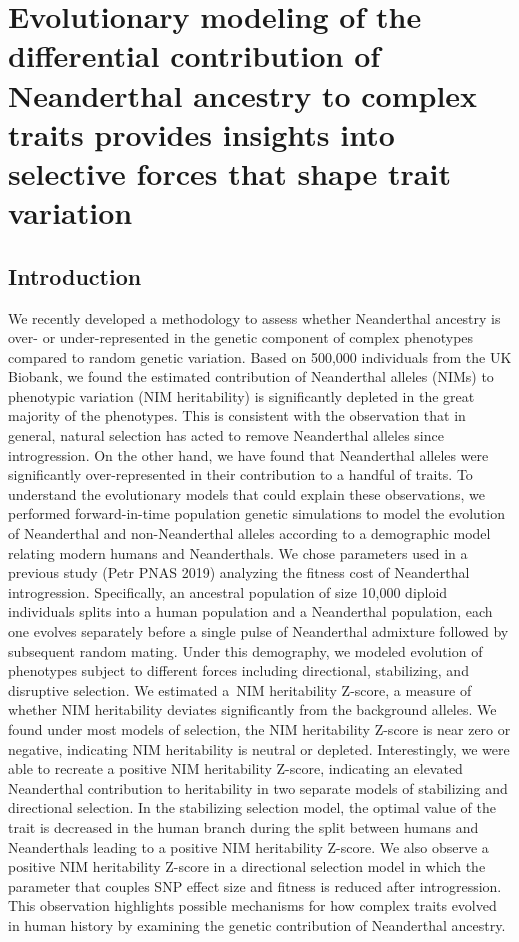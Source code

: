 \chapter{Evolutionary modeling of the differential contribution of Neanderthal ancestry to complex traits provides insights into selective forces that shape trait variation}
\section{Introduction}
We recently developed a methodology to assess whether Neanderthal ancestry is over- or under-represented in the genetic component of complex phenotypes compared to random genetic variation. Based on 500,000 individuals from the UK Biobank, we found the estimated contribution of Neanderthal alleles (NIMs) to phenotypic variation (NIM heritability) is significantly depleted in the great majority of the phenotypes. This is consistent with the observation that in general, natural selection has acted to remove Neanderthal alleles since introgression. On the other hand, we have found that Neanderthal alleles were significantly over-represented in their contribution to a handful of traits.
To understand the evolutionary models that could explain these observations, we performed forward-in-time population genetic simulations to model the evolution of Neanderthal and non-Neanderthal alleles according to a demographic model relating modern humans and Neanderthals. We chose parameters used in a previous study (Petr PNAS 2019) analyzing the fitness cost of Neanderthal introgression. Specifically, an ancestral population of size 10,000 diploid individuals splits into a human population and a Neanderthal population, each one evolves separately before a single pulse of Neanderthal admixture followed by subsequent random mating. Under this demography, we modeled evolution of phenotypes subject to different forces including directional, stabilizing, and disruptive selection. We estimated a NIM heritability Z-score, a measure of whether NIM heritability deviates significantly from the background alleles. We found under most models of selection, the NIM heritability Z-score is near zero or negative, indicating NIM heritability is neutral or depleted. Interestingly, we were able to recreate a positive NIM heritability Z-score, indicating an elevated Neanderthal contribution to heritability in two separate models of stabilizing and directional selection. In the stabilizing selection model, the optimal value of the trait is decreased in the human branch during the split between humans and Neanderthals leading to a positive NIM heritability Z-score. We also observe a positive NIM heritability Z-score in a directional selection model in which the parameter that couples SNP effect size and fitness is reduced after introgression. This observation highlights possible mechanisms for how complex traits evolved in human history by examining the genetic contribution of Neanderthal ancestry.
